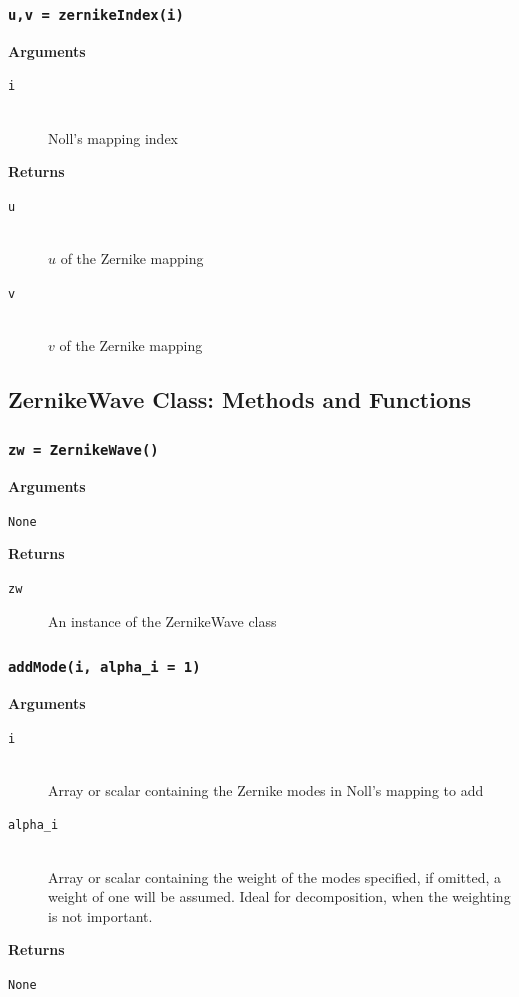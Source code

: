 \documentclass{article}
\begin{document}
\newpage
\subsubsection*{\texttt{u,v = zernikeIndex(i)}}
\textbf{Arguments}
\begin{description}
\item[\texttt{i}] \hfill \\
Noll's mapping index
\end{description}
\textbf{Returns}
\begin{description}
\item[\texttt{u}] \hfill \\
$u$ of the Zernike mapping
\item[\texttt{v}] \hfill \\
$v$ of the Zernike mapping
\end{description}

\newpage
\subsection{ZernikeWave Class: Methods and Functions}
\subsubsection*{\texttt{zw = ZernikeWave()}}
\textbf{Arguments}
\begin{description}
	\item[\texttt{None}]
\end{description}
\textbf{Returns}
\begin{description}
	\item[\texttt{zw}]
	An instance of the ZernikeWave class
\end{description}

\newpage
\subsubsection*{\texttt{addMode(i, alpha\_i = 1)}}
\textbf{Arguments}
\begin{description}
  \item[\texttt{i}] \hfill \\
  Array or scalar containing the Zernike modes in Noll's mapping to add
  \item[\texttt{alpha\_i}] \hfill \\
  Array or scalar containing the weight of the modes specified, if omitted, a weight of one will be assumed. Ideal for decomposition, when the weighting is not important.
\end{description}
\textbf{Returns}
\begin{description}
	\item[\texttt{None}]
\end{description}
\end{document}
